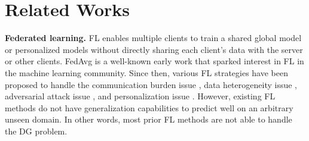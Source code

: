\documentclass{article}
\theoremstyle{plain}
\theoremstyle{definition}
\theoremstyle{remark}
\begin{document}
\section{Related Works}\label{sec:related}
\vspace{-1mm}
\textbf{Federated learning.} FL  enables multiple clients to train a shared global model or personalized models without directly sharing each client's data with the server or other clients.  FedAvg  \cite{mcmahan2017communication} is a well-known early work that sparked interest in FL in the machine learning community. Since then, various  FL strategies have been proposed    to handle  the communication burden issue  \cite{reisizadeh2020fedpaq,hamer2020fedboost}, data heterogeneity issue  \cite{li2020federated, karimireddy2020scaffold},  adversarial attack issue \cite{wang2020attack, park2021sageflow, fang2020local}, and  personalization issue  \cite{deng2020adaptive, li2021ditto, fallah2020personalized}. However,   existing   FL methods do not have generalization capabilities to predict well on  an arbitrary unseen domain. In other words,  most prior FL methods are not  able to  handle the DG problem.

 
\end{document}
